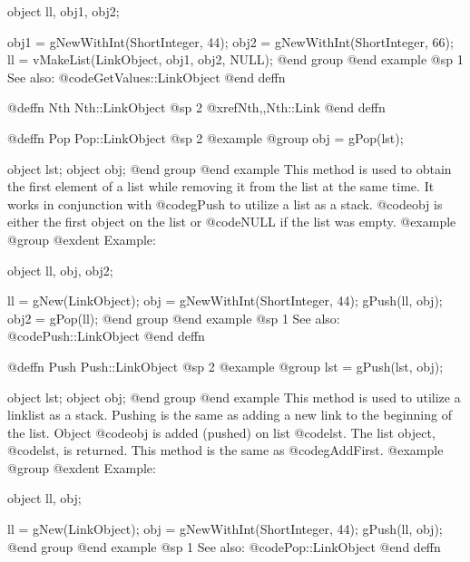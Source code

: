 object  ll, obj1, obj2;

obj1 = gNewWithInt(ShortInteger, 44);
obj2 = gNewWithInt(ShortInteger, 66);
ll = vMakeList(LinkObject, obj1, obj2, NULL);
@end group
@end example
@sp 1
See also:  @code{GetValues::LinkObject}
@end deffn









@deffn {Nth} Nth::LinkObject
@sp 2
@xref{Nth,,Nth::Link}
@end deffn
















@deffn {Pop} Pop::LinkObject
@sp 2
@example
@group
obj = gPop(lst);

object  lst;
object  obj;
@end group
@end example
This method is used to obtain the first element of a list while
removing it from the list at the same time.  It works in conjunction
with @code{gPush} to utilize a list as a stack.  @code{obj} is either
the first object on the list or @code{NULL} if the list was empty.
@example
@group
@exdent Example:

object  ll, obj, obj2;

ll = gNew(LinkObject);
obj = gNewWithInt(ShortInteger, 44);
gPush(ll, obj);
obj2 = gPop(ll);
@end group
@end example
@sp 1
See also:  @code{Push::LinkObject}
@end deffn










@deffn {Push} Push::LinkObject
@sp 2
@example
@group
lst = gPush(lst, obj);

object  lst;
object  obj;
@end group
@end example
This method is used to utilize a linklist as a stack.  Pushing is the
same as adding a new link to the beginning of the list.  Object
@code{obj} is added (pushed) on list @code{lst}.  The list object,
@code{lst}, is returned.  This method is the same as @code{gAddFirst}.
@example
@group
@exdent Example:

object  ll, obj;

ll = gNew(LinkObject);
obj = gNewWithInt(ShortInteger, 44);
gPush(ll, obj);
@end group
@end example
@sp 1
See also:  @code{Pop::LinkObject}
@end deffn









